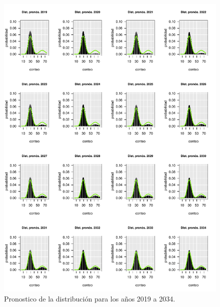 \documentclass[a4paper]{article}\usepackage[]{graphicx}\usepackage[]{color}
\makeatletter
\def\maxwidth{ %
  \ifdim\Gin@nat@width>\linewidth
    \linewidth
  \else
    \Gin@nat@width
  \fi
}
\newenvironment{knitrout}{}{} %
\makeatother
\begin{document}
\begin{knitrout}
\color{fgcolor}\begin{figure}
\includegraphics[width=\maxwidth]{figure/unnamed-chunk-19-1} \caption[Pronostico de la distribución para los años 2019 a 2034]{Pronostico de la distribución para los años 2019 a 2034.}\label{fig:unnamed-chunk-19}
\end{figure}


\end{knitrout}
\end{document}
